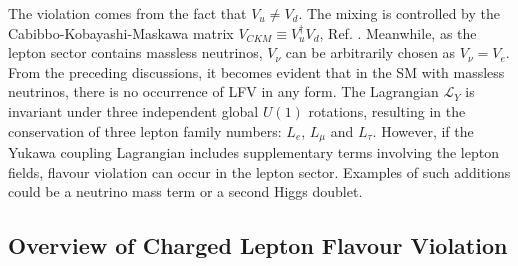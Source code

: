 The violation comes from the fact that $V_u \neq V_d$. The mixing 
is controlled by the Cabibbo-Kobayashi-Maskawa matrix 
$V_{CKM}\equiv V^{\dagger}_u V_d $, Ref. \cite{PhysRevLett.10.531}. 
Meanwhile, as the lepton sector contains massless neutrinos, 
$V_{\nu}$ can be arbitrarily chosen as $V_{\nu}=V_e$. From the 
preceding discussions, it becomes evident that in the SM with 
massless neutrinos, there is no occurrence of LFV in any form. The 
Lagrangian $\mathscr{L}_Y$ is invariant under three independent 
global $U(1)$ rotations, resulting in the conservation of three 
lepton family numbers: $L_e$, $L_\mu$ and $L_\tau$. However, if the 
Yukawa coupling Lagrangian includes supplementary terms involving the 
lepton fields, flavour violation can occur in the lepton sector. 
Examples of such additions could be a neutrino mass term or a second Higgs doublet.

\subsection{Overview of Charged Lepton Flavour Violation}\label{ovclfv}

